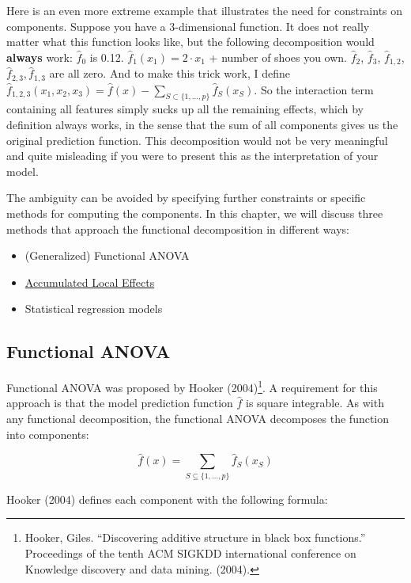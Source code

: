 \documentclass[
  11pt,
]{scrbook}
\providecommand{\tightlist}{%
  \setlength{\itemsep}{0pt}\setlength{\parskip}{0pt}}
\begin{document}
Here is an even more extreme example that illustrates the need for constraints on components.
Suppose you have a 3-dimensional function.
It does not really matter what this function looks like, but the following decomposition would \textbf{always} work:
\(\hat{f}_0\) is 0.12.
\(\hat{f}_1(x_1)=2\cdot{}x_1\) + number of shoes you own.
\(\hat{f}_2\), \(\hat{f}_3\), \(\hat{f}_{1,2}\), \(\hat{f}_{2,3}, \hat{f}_{1,3}\) are all zero.
And to make this trick work, I define \(\hat{f}_{1,2,3}(x_1,x_2,x_3)=\hat{f}(x)-\sum_{S\subset\{1,\ldots,p\}}\hat{f}_S(x_S)\).
So the interaction term containing all features simply sucks up all the remaining effects, which by definition always works, in the sense that the sum of all components gives us the original prediction function.
This decomposition would not be very meaningful and quite misleading if you were to present this as the interpretation of your model.

The ambiguity can be avoided by specifying further constraints or specific methods for computing the components.
In this chapter, we will discuss three methods that approach the functional decomposition in different ways:

\begin{itemize}
\tightlist
\item
  (Generalized) Functional ANOVA
\item
  \protect\hyperlink{ale}{Accumulated Local Effects}
\item
  Statistical regression models
\end{itemize}

\hypertarget{functional-anova}{%
\subsection{Functional ANOVA}\label{functional-anova}}

Functional ANOVA was proposed by Hooker (2004)\footnote{Hooker, Giles. ``Discovering additive structure in black box functions.'' Proceedings of the tenth ACM SIGKDD international conference on Knowledge discovery and data mining. (2004).}.
A requirement for this approach is that the model prediction function \(\hat{f}\) is square integrable.
As with any functional decomposition, the functional ANOVA decomposes the function into components:

\[\hat{f}(x) = \sum_{S\subseteq\{1,\ldots,p\}} \hat{f}_S(x_S)\]

Hooker (2004) defines each component with the following formula:
\end{document}
